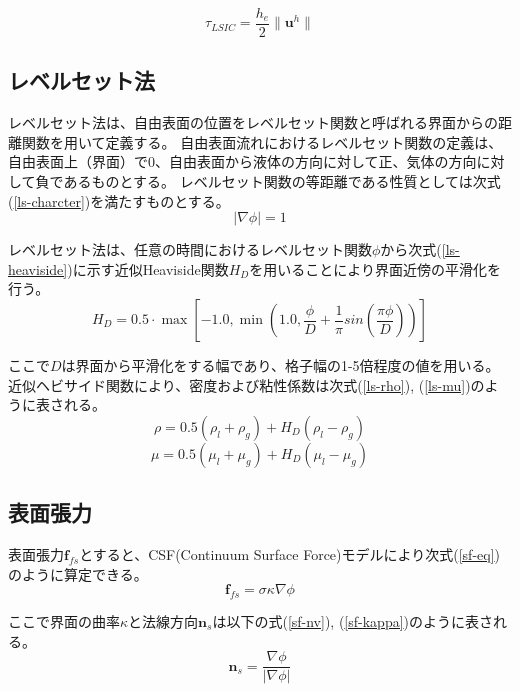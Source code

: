 \begin{equation}
\label{ls-tau_LSIC}
	\tau_{LSIC} = \frac{h_{e}}{2} \| \bm{u}^{h} \|
\end{equation}

\subsection{レベルセット法}
レベルセット法は、自由表面の位置をレベルセット関数と呼ばれる界面からの距離関数を用いて定義する。
自由表面流れにおけるレベルセット関数の定義は、自由表面上（界面）で0、自由表面から液体の方向に対して正、気体の方向に対して負であるものとする。
レベルセット関数の等距離である性質としては次式(\ref{ls-charcter})を満たすものとする。
\begin{equation}
\label{ls-charcter}
	| \nabla \phi | = 1
\end{equation}

レベルセット法は、任意の時間におけるレベルセット関数$\phi$から次式(\ref{ls-heaviside})に示す近似Heaviside関数$H_{D}$を用いることにより界面近傍の平滑化を行う。
\begin{equation}
\label{ls-heaviside}
	H_{D} = 0.5 \cdot \max \left[-1.0, \min \left(1.0, \frac{\phi}{D} + \frac{1}{\pi} sin\left(\frac{\pi \phi}{D}\right)\right) \right]
\end{equation}

ここで$D$は界面から平滑化をする幅であり、格子幅の1-5倍程度の値を用いる。
近似ヘビサイド関数により、密度および粘性係数は次式(\ref{ls-rho}), (\ref{ls-mu})のように表される。
\begin{equation}
\label{ls-rho}
	\rho = 0.5 (\rho_l + \rho_g) + H_{D} (\rho_l - \rho_g)
\end{equation}
\begin{equation}
\label{ls-mu}
	\mu = 0.5 (\mu_l + \mu_g) + H_{D} (\mu_l - \mu_g)
\end{equation}


\subsection{表面張力}
表面張力$\bm{f}_{fs}$とすると、CSF(Continuum Surface Force)モデルにより次式(\ref{sf-eq})のように算定できる。
\begin{equation}
\label{sf-eq}
	\bm{f}_{fs} = \sigma \kappa \nabla \phi
\end{equation}

ここで界面の曲率$\kappa$と法線方向$\bm{n}_{s}$は以下の式(\ref{sf-nv}), (\ref{sf-kappa})のように表される。
\begin{equation}
\label{sf-nv}
	\bm{n}_{s} = \frac{\nabla \phi}{| \nabla \phi |}
\end{equation}

